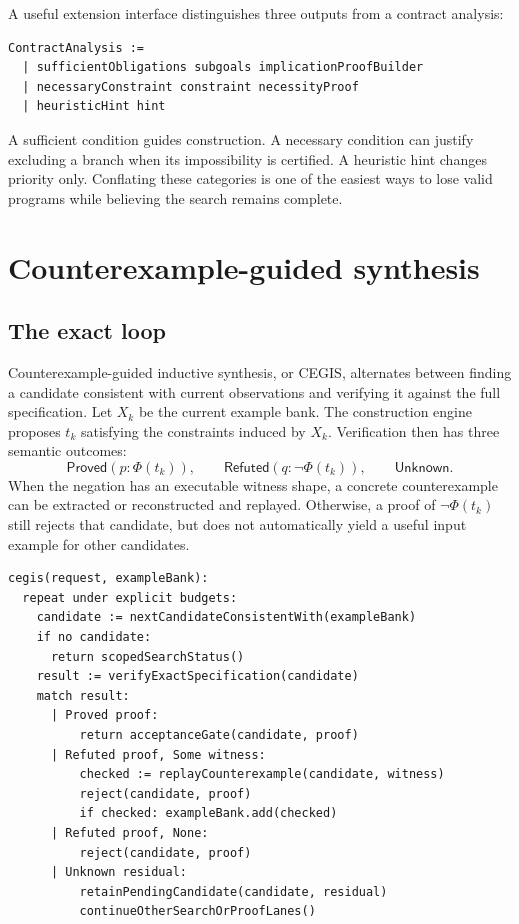 \documentclass[11pt,letterpaper]{article}
\theoremstyle{definition}
\theoremstyle{remark}
\begin{document}
A useful extension interface distinguishes three outputs from a contract analysis:
\Needspace{106pt}
\begin{lstlisting}
ContractAnalysis :=
  | sufficientObligations subgoals implicationProofBuilder
  | necessaryConstraint constraint necessityProof
  | heuristicHint hint
\end{lstlisting}
A sufficient condition guides construction. A necessary condition can justify excluding a branch when its impossibility is certified. A heuristic hint changes priority only. Conflating these categories is one of the easiest ways to lose valid programs while believing the search remains complete.

\section{Counterexample-guided synthesis}
\label{sec:cegis}

\subsection{The exact loop}

Counterexample-guided inductive synthesis, or CEGIS, alternates between finding a candidate consistent with current observations and verifying it against the full specification. Let $X_k$ be the current example bank. The construction engine proposes $t_k$ satisfying the constraints induced by $X_k$. Verification then has three semantic outcomes:
\[
 \mathsf{Proved}(p:\Phi(t_k)),\qquad
 \mathsf{Refuted}(q:\neg\Phi(t_k)),\qquad
 \mathsf{Unknown}.
\]
When the negation has an executable witness shape, a concrete counterexample can be extracted or reconstructed and replayed. Otherwise, a proof of $\neg\Phi(t_k)$ still rejects that candidate, but does not automatically yield a useful input example for other candidates.

\Needspace{262pt}
\begin{lstlisting}[caption={Proof-aware CEGIS. Pseudocode.}]
cegis(request, exampleBank):
  repeat under explicit budgets:
    candidate := nextCandidateConsistentWith(exampleBank)
    if no candidate:
      return scopedSearchStatus()
    result := verifyExactSpecification(candidate)
    match result:
      | Proved proof:
          return acceptanceGate(candidate, proof)
      | Refuted proof, Some witness:
          checked := replayCounterexample(candidate, witness)
          reject(candidate, proof)
          if checked: exampleBank.add(checked)
      | Refuted proof, None:
          reject(candidate, proof)
      | Unknown residual:
          retainPendingCandidate(candidate, residual)
          continueOtherSearchOrProofLanes()
\end{lstlisting}
\end{document}
